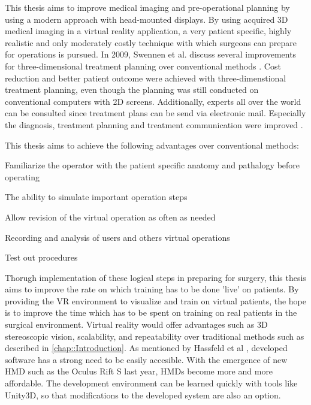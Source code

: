This thesis aims to improve medical imaging and pre-operational planning by using a modern approach with head-mounted displays.
By using acquired 3D medical imaging in a virtual reality application, a very patient specific, highly realistic and only moderately costly technique with which surgeons can prepare for operations is pursued.
\newline
In 2009, Swennen et al. discuss several improvements for three-dimensional treatment planning over conventional methods \cite{swennen2009three}.
Cost reduction and better patient outcome were achieved with three-dimenstional treatment planning, even though the planning was still conducted on conventional computers with 2D screens.
Additionally, experts all over the world can be consulted since treatment plans can be send via electronic mail.
Especially the diagnosis, treatment planning and treatment communication were improved \cite{swennen2009three}.

This thesis aims to achieve the following advantages over conventional methods:
\begin{compactenum}[label=(\alph*)]
    \item Familiarize the operator with the patient specific anatomy and pathalogy before operating
    \item The ability to simulate important operation steps
    \item Allow revision of the virtual operation as often as needed
    \item Recording and analysis of users and others virtual operations
    \item Test out procedures
\end{compactenum}

Thorugh implementation of these logical steps in preparing for surgery, this thesis aims to improve the rate on which training has to be done 'live' on patients.
By providing the VR environment to visualize and train on virtual patients, the hope is to improve the time which has to be spent on training on real patients in the surgical environment.
Virtual reality would offer advantages such as 3D stereoscopic vision, scalability, and repeatability over traditional methods such as described in \ref{chap::Introduction}.
As mentioned by Hassfeld et al \cite{HASSFELD20012}, developed software has a strong need to be easily accesible.
With the emergence of new HMD such as the Oculus Rift S last year, HMDs become more and more affordable.
The development environment can be learned quickly with tools like Unity3D, so that modifications to the developed system are also an option.

